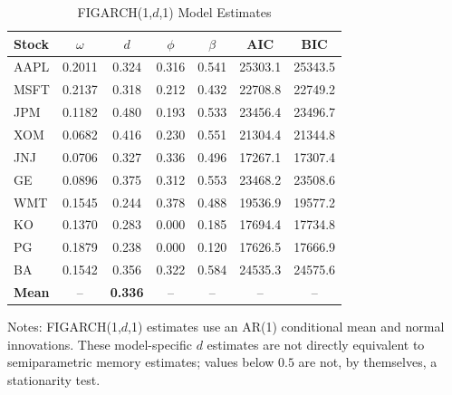 
\begin{table}[h!]
\centering
\caption{FIGARCH(1,$d$,1) Model Estimates}
\label{tab:figarch_estimates}
\small
\begin{tabular}{lcccccc}
\toprule
Stock & $\omega$ & $d$ & $\phi$ & $\beta$ & AIC & BIC \\
\midrule
AAPL & 0.2011 & 0.324 & 0.316 & 0.541 & 25303.1 & 25343.5 \\
MSFT & 0.2137 & 0.318 & 0.212 & 0.432 & 22708.8 & 22749.2 \\
JPM & 0.1182 & 0.480 & 0.193 & 0.533 & 23456.4 & 23496.7 \\
XOM & 0.0682 & 0.416 & 0.230 & 0.551 & 21304.4 & 21344.8 \\
JNJ & 0.0706 & 0.327 & 0.336 & 0.496 & 17267.1 & 17307.4 \\
GE & 0.0896 & 0.375 & 0.312 & 0.553 & 23468.2 & 23508.6 \\
WMT & 0.1545 & 0.244 & 0.378 & 0.488 & 19536.9 & 19577.2 \\
KO & 0.1370 & 0.283 & 0.000 & 0.185 & 17694.4 & 17734.8 \\
PG & 0.1879 & 0.238 & 0.000 & 0.120 & 17626.5 & 17666.9 \\
BA & 0.1542 & 0.356 & 0.322 & 0.584 & 24535.3 & 24575.6 \\
\midrule
\textbf{Mean} & -- & \textbf{0.336} & -- & -- & -- & -- \\
\bottomrule
\end{tabular}
\begin{tablenotes}\small
\item Notes: FIGARCH(1,$d$,1) estimates use an AR(1) conditional mean and
normal innovations. These model-specific $d$ estimates are not directly
equivalent to semiparametric memory estimates; values below $0.5$ are not,
by themselves, a stationarity test.
\end{tablenotes}
\end{table}
